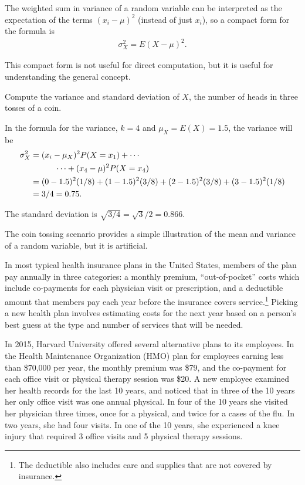 The weighted sum in variance of a random variable can be interpreted as the expectation of the terms $(x_i - \mu)^2$ (instead of just $x_i$), so a compact form for the formula is 
\begin{align*}
	 \sigma_X^2 = E(X - \mu)^2.
\end{align*}

This compact form is not useful for direct computation, but it is useful for understanding the general concept. 

\begin{example}{Compute the variance and standard deviation of $X$, the number of heads in three tosses of a coin.}
    
    In the formula for the variance, $k = 4$ and $\mu_X = E(X) = 1.5$, the variance will be 
    \begin{align}
    \sigma_X^2 &= (x_i-\mu_X)^2P(X=x_1) + \cdots \notag \\
    	& \qquad\quad\cdots+ (x_4-\mu)^2 P(X=x_4) \notag \\
    	&= (0- 1.5)^2(1/8) + (1 - 1.5)^2 (3/8) + 
        (2 -1.5)^2 (3/8) + (3-1.5)^2 (1/8) \notag \\
        &= 3/4 = 0.75.
    \end{align}
    
The standard deviation is $\sqrt{3/4} = \sqrt{3}/2 = 0.866$.  

\end{example}

The coin tossing scenario provides a simple illustration of the mean and variance of a random variable, but it is artificial. 

In most typical health insurance plans in the United States, members of the plan pay annually in three categories: a monthly premium, ``out-of-pocket'' costs which include co-payments for each physician visit or prescription, and a deductible amount that members pay each year before the insurance covers service.\footnote{The deductible also includes care and supplies that are not covered by insurance.} Picking a new health plan involves estimating costs for the next year based on a person's best guess at the type and number of services that will be needed.
	
In 2015, Harvard University offered several alternative plans to its employees.   In the Health Maintenance Organization (HMO) plan for employees earning less than \$70,000 per year, the monthly premium was \$79, and the co-payment for each office visit or physical therapy session was \$20. A new employee examined her health records for the last 10 years, and noticed that in three of the 10 years her only office visit was one annual physical.  In four of the 10 years she visited her physician three times, once for a physical, and twice for a cases of the flu. In two years, she had four visits.  In one of the 10 years, she experienced a knee injury that required 3 office visits and 5 physical therapy sessions.

